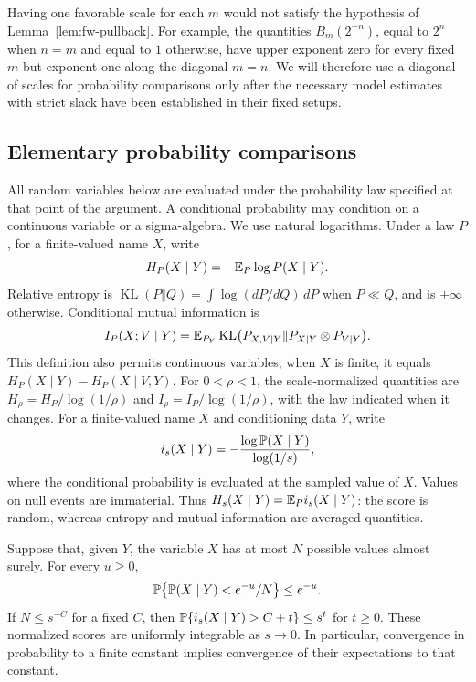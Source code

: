 Having one favorable scale for each $m$ would not satisfy the
hypothesis of Lemma~\ref{lem:fw-pullback}.  For example, the quantities
$B_m(2^{-n})$, equal to $2^n$ when $n=m$ and equal to $1$ otherwise,
have upper exponent zero for every fixed $m$ but exponent one along
the diagonal $m=n$.  We will therefore use a diagonal of scales for
probability comparisons only after the necessary model estimates
with strict slack have been established in their fixed setups.

\subsection{Elementary probability comparisons}

All random variables below are evaluated under the probability law
specified at that point of the argument.  A conditional probability
may condition on a continuous variable or a sigma-algebra. We use
natural logarithms. Under a law $P$, for a finite-valued name $X$,
write
\[
 H_P(X\mid Y)=-\mathbb E_P\log P(X\mid Y).
\]
Relative entropy is
$\operatorname{KL}(P\Vert Q)=\int\log(dP/dQ)\,dP$ when $P\ll Q$,
and is $+\infty$ otherwise. Conditional mutual information is
\[
 I_P(X;V\mid Y)
 =\mathbb E_{P_Y}\operatorname{KL}
   \bigl(P_{X,V\mid Y}\Vert P_{X\mid Y}\otimes P_{V\mid Y}\bigr).
\]
This definition also permits continuous variables; when $X$ is finite,
it equals $H_P(X\mid Y)-H_P(X\mid V,Y)$. For $0<\rho<1$, the
scale-normalized quantities are $H_\rho=H_P/\log(1/\rho)$ and
$I_\rho=I_P/\log(1/\rho)$, with the law indicated when it changes.
For a finite-valued name $X$ and conditioning data $Y$, write
\begin{equation}\label{eq:fw-score}
 i_s(X\mid Y)
   =-\frac{\log\mathbb P(X\mid Y)}{\log(1/s)},
\end{equation}
where the conditional probability is evaluated at the sampled value
of $X$. Values on null events are immaterial. Thus
$H_s(X\mid Y)=\mathbb E_P i_s(X\mid Y)$: the score is random, whereas
entropy and mutual information are averaged quantities.

\begin{lemma}\label{lem:fw-capacity}
Suppose that, given $Y$, the variable $X$ has at most $N$ possible
values almost surely.  For every $u\ge0$,
\begin{equation}\label{eq:fw-capacity}
 \mathbb P\bigl\{\mathbb P(X\mid Y)<e^{-u}/N\bigr\}\le e^{-u}.
\end{equation}
If $N\le s^{-C}$ for a fixed $C$, then
$\mathbb P\{i_s(X\mid Y)>C+t\}\le s^t$ for $t\ge0$.
These normalized scores are uniformly integrable as $s\to0$.
In particular, convergence in probability to a finite constant
implies convergence of their expectations to that constant.
\end{lemma}

